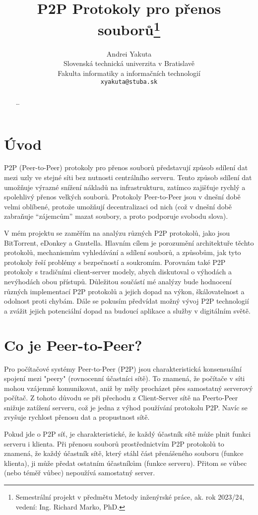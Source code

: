 \documentclass[10pt,twoside,czech,a4paper]{article}
\title{P2P Protokoly pro přenos souborů\thanks{Semestrální projekt v předmětu Metody inženýrské práce, ak. rok 2023/24, vedení: Ing. Richard Marko, PhD.}}
\author{Andrei Yakuta\\[2pt]
	{\small Slovenská technická univerzita v Bratislavě}\\
	{\small Fakulta informatiky a informačních technologií}\\
	{\small \texttt{xyakuta@stuba.sk}}
	}
\begin{document}
\maketitle

\begin{abstract}
\ldots
\end{abstract}



\section{Úvod}

P2P (Peer-to-Peer) protokoly pro přenos souborů představují způsob sdílení dat mezi uzly ve stejné síti bez nutnosti centrálního serveru.
Tento způsob sdílení dat umožňuje výrazné snížení nákladů na infrastrukturu, zatímco zajišťuje rychlý a spolehlivý přenos velkých souborů.
Protokoly Peer-to-Peer jsou v dnešní době velmi oblíbené, protože umožňují decentralizaci od nich (což v dnešní době zabraňuje “zájemcům” mazat soubory, a proto podporuje svobodu slova).

V mém projektu se zaměřím na analýzu různých P2P protokolů, jako jsou BitTorrent, eDonkey a Gnutella.
Hlavním cílem je porozumění architektuře těchto protokolů, mechanismům vyhledávání a sdílení souborů, a způsobům, jak tyto protokoly řeší problémy s bezpečností a soukromím.
Porovnám také P2P protokoly s tradičními client-server modely, abych diskutoval o výhodách a nevýhodách obou přístupů.
Důležitou součástí mé analýzy bude hodnocení různých implementací P2P protokolů a jejich dopad na výkon, škálovatelnost a odolnost proti chybám.
Dále se pokusím předvídat možný vývoj P2P technologií a zvážit jejich potenciální dopad na budoucí aplikace a služby v digitálním světě.


\section{Co je Peer-to-Peer?}

Pro počítačové systémy Peer-to-Peer (P2P) jsou charakteristická konsensuální spojení mezi "peery" (rovnocenní účastníci sítě).
To znamená, že počítače v síti mohou vzájemně komunikovat, aniž by měly procházet přes samostatný serverový počítač\cite{Bauwens2019}.
Z tohoto důvodu se při přechodu z Client-Server sítě na Peerto-Peer snižuje zatížení serveru, což je jedna z výhod používání protokolu P2P.
Navíc se zvyšuje rychlost přenosu dat a propustnost sítě.

Pokud jde o P2P síť, je charakteristické, že každý účastník sítě může plnit funkci serveru i klienta.
Při přenosu souborů prostřednictvím P2P protokolů to znamená, že každý účastník sítě, který stáhl část přenášeného souboru (funkce klienta), ji může předat ostatním účastníkům (funkce serveru).
Přitom se vůbec (nebo téměř vůbec) nepoužívá samostatný server.
\end{document}

